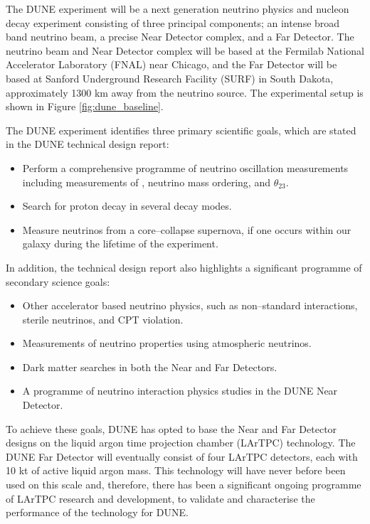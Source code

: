 The DUNE experiment will be a next generation neutrino physics and nucleon decay
experiment consisting of three principal components; an intense broad band 
neutrino beam, a precise Near Detector complex, and a Far Detector. The neutrino
beam and Near Detector complex will be based at the Fermilab National 
Accelerator Laboratory (FNAL) near Chicago, and the Far Detector will be based 
at Sanford Underground Research Facility (SURF) in South Dakota, approximately 
1300 km away from the neutrino source. The experimental setup is shown in Figure
\ref{fig:dune_baseline}. 

The DUNE experiment identifies three primary scientific goals, which are stated
in the DUNE technical design report\cite{Abi:2020evt}:
\begin{itemize}
	\item Perform a comprehensive programme of neutrino oscillation measurements
		including measurements of \dcp{}, neutrino mass ordering, and $\theta_{23}$.
	\item Search for proton decay in several decay modes.
	\item Measure neutrinos from a core--collapse supernova, if one occurs within 
		our galaxy during the lifetime of the experiment.
\end{itemize}
In addition, the technical design report also highlights a significant programme
of secondary science goals:
\begin{itemize}
	\item Other accelerator based neutrino physics, such as non--standard
		interactions, sterile neutrinos, and CPT violation.
	\item Measurements of neutrino properties using atmospheric neutrinos.
	\item Dark matter searches in both the Near and Far Detectors.
	\item A programme of neutrino interaction physics studies in the DUNE Near
		Detector.
\end{itemize}

\noindent
To achieve these goals, DUNE has opted to base the Near and Far Detector designs
on the liquid argon time projection chamber (LArTPC) technology. The DUNE
Far Detector will eventually consist of four LArTPC detectors, each with 10 kt 
of active liquid argon mass. This technology will have never before been used 
on this scale and, therefore, there has been a significant ongoing programme 
of LArTPC research and development, to validate and characterise the performance
of the technology for DUNE. 

